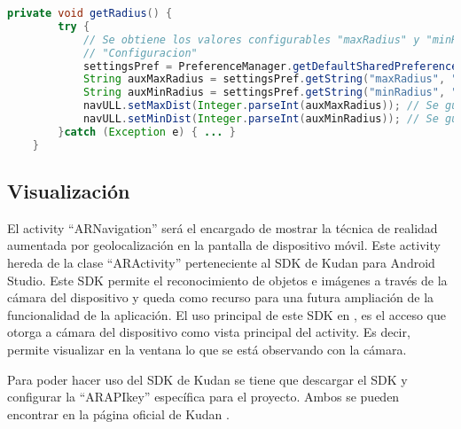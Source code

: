 \begin{lstlisting}[language=java, caption={Fichero \texttt{ARNavigation.java}, código que se encarga de obtener los valores de ``maxDist'' y ``minDist'' del objeto ``navULL''.},  label={lst:shared}]
    private void getRadius() {
        try {
            // Se obtiene los valores configurables "maxRadius" y "minRadius" en la ventana de 
            // "Configuracion"
            settingsPref = PreferenceManager.getDefaultSharedPreferences(getContext());
            String auxMaxRadius = settingsPref.getString("maxRadius", "null");
            String auxMinRadius = settingsPref.getString("minRadius", "null");
            navULL.setMaxDist(Integer.parseInt(auxMaxRadius)); // Se guarda el valor "maxRadius"
            navULL.setMinDist(Integer.parseInt(auxMinRadius)); // Se guarda el valor "minRadius"
        }catch (Exception e) { ... }
    }
\end{lstlisting}

\subsection{Visualización}

El activity ``ARNavigation'' será el encargado de mostrar la técnica de realidad aumentada por geolocalización en la pantalla de dispositivo móvil. Este activity hereda de la clase ``ARActivity'' perteneciente al  SDK de Kudan para Android Studio. Este SDK permite el reconocimiento de objetos e imágenes a través de la cámara del dispositivo y queda como recurso para una futura ampliación de la funcionalidad de la aplicación. El uso principal de este SDK en \ULLAR{}, es el acceso que otorga a cámara del dispositivo como vista principal del activity. Es decir, permite visualizar en la ventana lo que se está observando con la cámara.

Para poder hacer uso del SDK de Kudan se tiene que descargar el SDK y configurar la ``ARAPIkey'' específica para el proyecto. Ambos se pueden encontrar en la página oficial de Kudan \cite{URL::kudan}. 



